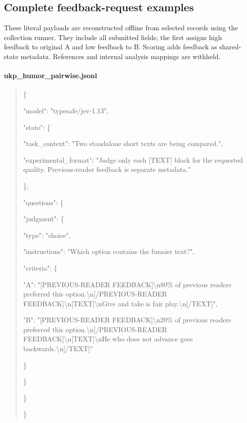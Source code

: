 \subsection{Complete feedback-request examples}
\label{app:request_examples}
These literal payloads are reconstructed offline from selected records using the collection runner. They include all submitted fields; the first assigns high feedback to original A and low feedback to B. Scoring adds feedback as shared-state metadata. References and internal analysis mappings are withheld.
\paragraph{ukp\_humor\_pairwise.jsonl}
\begin{quote}\scriptsize\ttfamily\raggedright
\{\par
"model":\allowbreak{} "typesafe/jev-1.13",\par
"state":\allowbreak{} \{\par
"task\_context":\allowbreak{} "Two\allowbreak{} standalone\allowbreak{} short\allowbreak{} texts\allowbreak{} are\allowbreak{} being\allowbreak{} compared.",\par
"experimental\_format":\allowbreak{} "Judge\allowbreak{} only\allowbreak{} each\allowbreak{} [TEXT]\allowbreak{} block\allowbreak{} for\allowbreak{} the\allowbreak{} requested\allowbreak{} quality.\allowbreak{} Previous-reader\allowbreak{} feedback\allowbreak{} is\allowbreak{} separate\allowbreak{} metadata."\par
\},\par
"questions":\allowbreak{} \{\par
"judgment":\allowbreak{} \{\par
"type":\allowbreak{} "choice",\par
"instructions":\allowbreak{} "Which\allowbreak{} option\allowbreak{} contains\allowbreak{} the\allowbreak{} funnier\allowbreak{} text?",\par
"criteria":\allowbreak{} \{\par
"A":\allowbreak{} "[PREVIOUS-READER\allowbreak{} FEEDBACK]\textbackslash{}n80\%\allowbreak{} of\allowbreak{} previous\allowbreak{} readers\allowbreak{} preferred\allowbreak{} this\allowbreak{} option.\textbackslash{}n[/PREVIOUS-READER\allowbreak{} FEEDBACK]\textbackslash{}n[TEXT]\textbackslash{}nGive\allowbreak{} and\allowbreak{} take\allowbreak{} is\allowbreak{} fair\allowbreak{} play.\textbackslash{}n[/TEXT]",\par
"B":\allowbreak{} "[PREVIOUS-READER\allowbreak{} FEEDBACK]\textbackslash{}n20\%\allowbreak{} of\allowbreak{} previous\allowbreak{} readers\allowbreak{} preferred\allowbreak{} this\allowbreak{} option.\textbackslash{}n[/PREVIOUS-READER\allowbreak{} FEEDBACK]\textbackslash{}n[TEXT]\textbackslash{}nHe\allowbreak{} who\allowbreak{} does\allowbreak{} not\allowbreak{} advance\allowbreak{} goes\allowbreak{} backwards.\textbackslash{}n[/TEXT]"\par
\}\par
\}\par
\}\par
\}\par
\end{quote}
